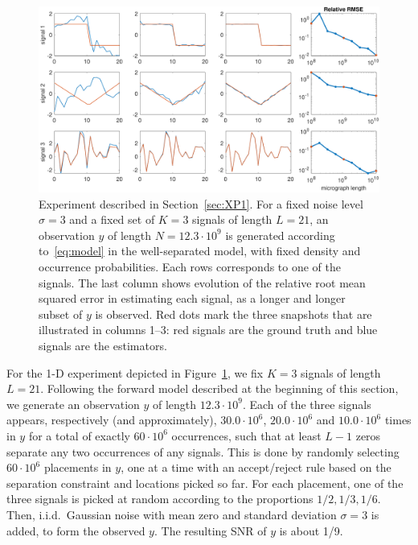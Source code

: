 \documentclass[12pt]{article}
\newcommand{\1}{\mathbf{1}}
\theoremstyle{plain}
\theoremstyle{definition}
\theoremstyle{remark}
\theoremstyle{plain}
\theoremstyle{remark}
\theoremstyle{plain}
\theoremstyle{plain}
\theoremstyle{plain}
\numberwithin{equation}{section}
\begin{document}
\begin{figure}[t]
	\centering
	\includegraphics[width=1\linewidth]{heterogeneous_progressive_n12300000000_466300}
	\caption{Experiment described in Section~\ref{sec:XP1}. For a fixed noise level $\sigma = 3$ and a fixed set of $K = 3$ signals of length $L = 21$, an observation $y$ of length $N = 12.3 \cdot 10^9$ is generated according to~\eqref{eq:model} in the well-separated model, with fixed density and occurrence probabilities. Each rows corresponds to one of the signals. The last column shows evolution of the relative root mean squared error in estimating each signal, as a longer and longer subset of $y$ is observed. Red dots mark the three snapshots that are illustrated in columns 1--3: red signals are the ground truth and blue signals are the estimators.}
	\label{fig:1Dheterosignals}
\end{figure}

For the 1-D experiment depicted in Figure~\ref{fig:1Dheterosignals}, we fix $K = 3$ signals of length $L = 21$. Following the forward model described at the beginning of this section, we generate an observation $y$ of length $12.3 \cdot 10^9$. Each of the three signals appears, respectively (and approximately), $30.0 \cdot 10^6$, $20.0 \cdot 10^6$ and $10.0 \cdot 10^6$ times in $y$ for a total of exactly $60 \cdot 10^6$ occurrences, such that at least $L-1$ zeros separate any two occurrences of any signals. 
This is done by randomly selecting $60 \cdot 10^6$ placements in $y$, one at a time with an accept/reject rule based on the separation constraint and locations picked so far. For each placement, one of the three signals is picked at random according to the proportions $1/2, 1/3, 1/6$. Then, i.i.d.\ Gaussian noise with mean zero and standard deviation $\sigma = 3$ is added, to form the observed $y$. The resulting SNR of $y$
is about 1/9.
\end{document}
